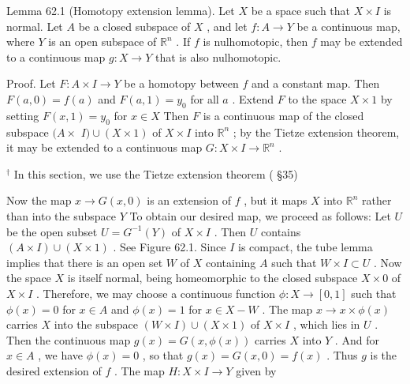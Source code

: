 Lemma 62.1 (Homotopy extension lemma). Let \(X\) be a space such that \(X \times  I\) is normal. Let \(A\) be a closed subspace of \(X\) , and let \(f : A \rightarrow  Y\) be a continuous map, where \(Y\) is an open subspace of \({\mathbb{R}}^{n}\) . If \(f\) is nulhomotopic, then \(f\) may be extended to a continuous map \(g : X \rightarrow  Y\) that is also nulhomotopic.

Proof. Let \(F : A \times  I \rightarrow  Y\) be a homotopy between \(f\) and a constant map. Then \(F\left( {a,0}\right)  = f\left( a\right)\) and \(F\left( {a,1}\right)  = {y}_{0}\) for all \(a\) . Extend \(F\) to the space \(X \times  1\) by setting \(F\left( {x,1}\right)  = {y}_{0}\) for \(x \in  X\) Then \(F\) is a continuous map of the closed subspace \((A \times\)  \(I) \cup  \left( {X \times  1}\right)\) of \(X \times  I\) into \({\mathbb{R}}^{n}\) ; by the Tietze extension theorem, it may be extended to a continuous map \(G : X \times  I \rightarrow  {\mathbb{R}}^{n}\) .

\HRule

\({}^{ \dagger  }\) In this section, we use the Tietze extension theorem ( \S 35)

\HRule

Now the map \(x \rightarrow  G\left( {x,0}\right)\) is an extension of \(f\) , but it maps \(X\) into \({\mathbb{R}}^{n}\) rather than into the subspace \(Y\) To obtain our desired map, we proceed as follows: Let \(U\) be the open subset \(U = {G}^{-1}\left( Y\right)\) of \(X \times  I\) . Then \(U\) contains \(\left( {A \times  I}\right)  \cup  \left( {X \times  1}\right)\) . See Figure 62.1. Since \(I\) is compact, the tube lemma implies that there is an open set \(W\) of \(X\) containing \(A\) such that \(W \times  I \subset  U\) . Now the space \(X\) is itself normal, being homeomorphic to the closed subspace \(X \times  0\) of \(X \times  I\) . Therefore, we may choose a continuous function \(\phi  : X \rightarrow  \left\lbrack  {0,1}\right\rbrack\) such that \(\phi \left( x\right)  = 0\) for \(x \in  A\) and \(\phi \left( x\right)  = 1\) for \(x \in  X - W\) . The map \(x \rightarrow  x \times  \phi \left( x\right)\) carries \(X\) into the subspace \(\left( {W \times  I}\right)  \cup  \left( {X \times  1}\right)\) of \(X \times  I\) , which lies in \(U\) . Then the continuous map \(g\left( x\right)  = G\left( {x,\phi \left( x\right) }\right)\) carries \(X\) into \(Y\) . And for \(x \in  A\) , we have \(\phi \left( x\right)  = 0\) , so that \(g\left( x\right)  = G\left( {x,0}\right)  = f\left( x\right)\) . Thus \(g\) is the desired extension of \(f\) . The map \(H : X \times  I \rightarrow  Y\) given by

